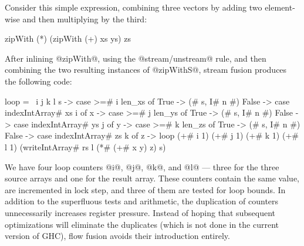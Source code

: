 Consider this simple expression, combining three vectors by adding two element-wise and then multiplying by the third:
%
\begin{code}
  zipWith (*) (zipWith (+) xs ys) zs
\end{code}
%
After inlining @zipWith@, using the @stream/unstream@ rule, and then combining the two resulting instances of @zipWithS@, stream fusion produces the following code:
%
\begin{code}
loop = \ i j k l s ->
 case >=# i len_xs of
  True  -> (# s, I# n #)
  False ->
   case indexIntArray# xs i of
    x -> case >=# j len_ys of
     True  -> (# s, I# n #)
     False -> 
      case indexIntArray# ys j of
       y -> case >=# k len_zs of
        True -> (# s, I# n #)
        False ->
         case indexIntArray# zs k of
          z ->
           loop (+# i 1) (+# j 1) (+# k 1) (+# l 1) 
            (writeIntArray# rs l (*# (+# x y) z) s)
\end{code}
%
We have four loop counters @i@, @j@, @k@, and @l@ --- three for the three source arrays and one for the result array. These counters contain the same value, are incremented in lock step, and three of them are tested for loop bounds. In addition to the superfluous tests and arithmetic, the duplication of counters unnecessarily increases register pressure. Instead of hoping that subsequent optimizations will eliminate the duplicates (which is not done in the current version of GHC), flow fusion avoids their introduction entirely.

